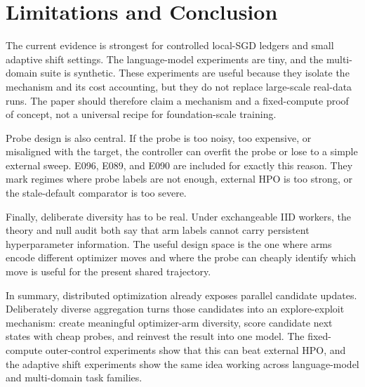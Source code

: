 \section{Limitations and Conclusion}
\label{sec:limitations}

The current evidence is strongest for controlled local-SGD ledgers and small
adaptive shift settings. The language-model experiments are tiny, and the
multi-domain suite is synthetic. These experiments are useful because they
isolate the mechanism and its cost accounting, but they do not replace
large-scale real-data runs. The paper should therefore claim a mechanism and a
fixed-compute proof of concept, not a universal recipe for foundation-scale
training.

Probe design is also central. If the probe is too noisy, too expensive, or
misaligned with the target, the controller can overfit the probe or lose to a
simple external sweep. E096, E089, and E090 are included for exactly this
reason. They mark regimes where probe labels are not enough, external HPO is
too strong, or the stale-default comparator is too severe.

Finally, deliberate diversity has to be real. Under exchangeable IID workers,
the theory and null audit both say that arm labels cannot carry persistent
hyperparameter information. The useful design space is the one where arms
encode different optimizer moves and where the probe can cheaply identify
which move is useful for the present shared trajectory.

In summary, distributed optimization already exposes parallel candidate
updates. Deliberately diverse aggregation turns those candidates into an
explore-exploit mechanism: create meaningful optimizer-arm diversity, score
candidate next states with cheap probes, and reinvest the result into one
model. The fixed-compute outer-control experiments show that this can beat
external HPO, and the adaptive shift experiments show the same idea working
across language-model and multi-domain task families.
